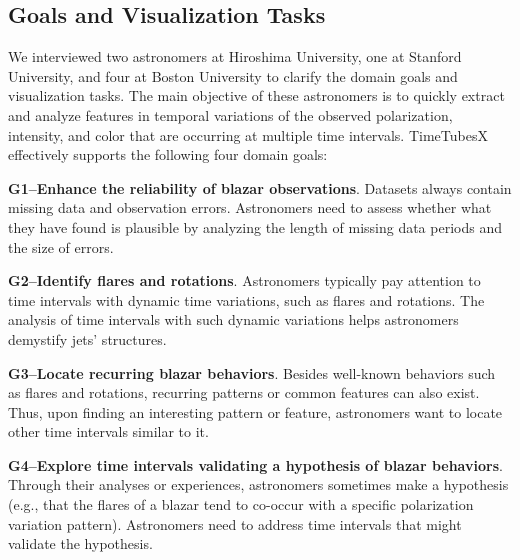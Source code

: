 \subsection{Goals and Visualization Tasks}\label{sec:domainGoalsandTasks}
We interviewed two astronomers at Hiroshima University, one at Stanford University, and four at Boston University to clarify the domain goals and visualization tasks.
The main objective of these astronomers is 
to quickly extract and analyze features in temporal variations of the observed polarization, intensity, and color that are occurring at multiple time intervals. 
TimeTubesX effectively supports the following four domain goals:

\noindent\textbf{G1--Enhance the reliability of blazar observations}. 
Datasets always contain missing data and observation errors. 
Astronomers need to assess whether what they have found is plausible by analyzing the length of missing data periods and the size of errors.

\noindent\textbf{G2--Identify flares and rotations}. 
Astronomers typically pay attention to time intervals with dynamic time variations, %
such as flares and rotations.
The analysis of time intervals with such dynamic variations helps astronomers demystify jets' structures.

\noindent\textbf{G3--Locate recurring blazar behaviors}.
Besides well-known behaviors such as flares and rotations, 
recurring patterns or common features can also exist.
Thus, upon finding an interesting pattern or feature, 
astronomers want to locate other time intervals similar to it.

\noindent\textbf{G4--Explore time intervals validating a hypothesis of blazar behaviors}.
Through their analyses or experiences, astronomers sometimes make a hypothesis (e.g., that the flares of a blazar tend to co-occur with a specific polarization variation pattern). 
Astronomers need to address time intervals that might validate the hypothesis.

